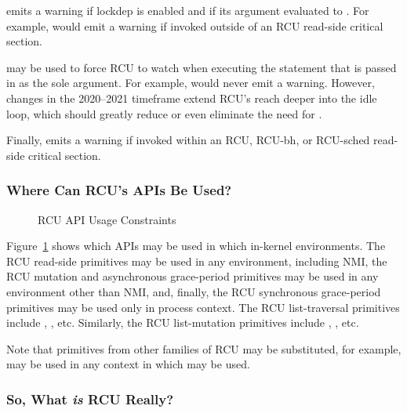  emits a warning if lockdep is enabled and if
its argument evaluated to .
For example,  would emit a
warning if invoked outside of an RCU read-side critical section.

 may be used to force RCU to watch when executing
the statement that is passed in as the sole argument.
For example, 
would never emit a warning.
However, changes in the 2020--2021 timeframe extend RCU's reach deeper
into the idle loop, which should greatly reduce or even eliminate the
need for .

Finally,   emits a warning if invoked within
an RCU, RCU-bh, or RCU-sched read-side critical section.

\fi

\subsubsection{Where Can RCU's APIs Be Used?}
\label{sec:defer:Where Can RCU's APIs Be Used?}

\begin{figure}[tb]
\centering
{}
\caption{RCU API Usage Constraints}
\label{fig:defer:RCU API Usage Constraints}
\end{figure}

Figure~\ref{fig:defer:RCU API Usage Constraints}
shows which APIs may be used in which in-kernel environments.
The RCU read-side primitives may be used in any environment, including NMI,
the RCU mutation and asynchronous grace-period primitives may be used in any
environment other than NMI, and, finally, the RCU synchronous grace-period
primitives may be used only in process context.
The RCU list-traversal primitives include ,
, etc.
Similarly, the RCU list-mutation primitives include
, , etc.

Note that primitives from other families of RCU may be substituted,
for example,  may be used in any context
in which  may be used.

\subsubsection{So, What \emph{is} RCU Really?}
\label{sec:defer:So, What is RCU Really?}


